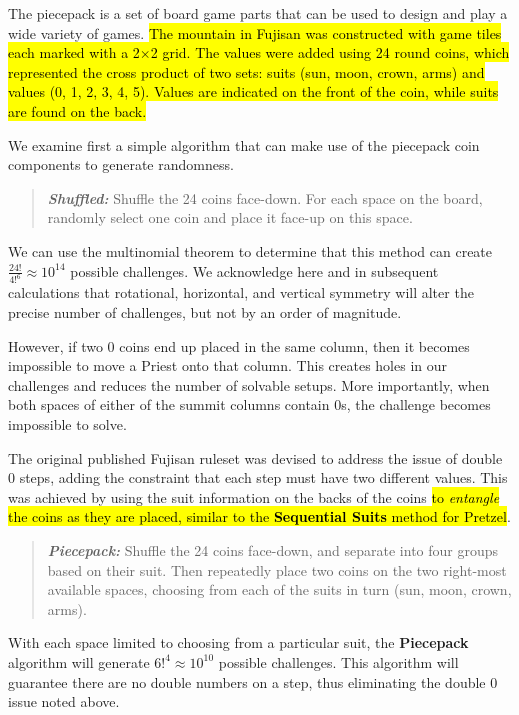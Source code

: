 \documentclass[journal]{IEEEtran}
\begin{document}
The piecepack is a set of board game parts that can be used to design and play a wide variety of games\cite{GAMESYSTEM}. \hl{The mountain in Fujisan was constructed with game tiles each marked with a 2$\times$2 grid. The values were added using 24 round coins, which represented the cross product of two sets: suits (sun, moon, crown, arms) and values (0, 1, 2, 3, 4, 5). Values are indicated on the front of the coin, while suits are found on the back.}

We examine first a simple algorithm that can make use of the piecepack coin components to generate randomness. 

\begin{quote}
    
  {\it \bf Shuffled:} Shuffle the 24 coins face-down. For each space on the board, randomly select one coin and place it face-up on this space.
  
\end{quote}

We can use the multinomial theorem to determine that this method can create
$\frac{24!}{4!^{6}} \approx 10^{14}$ possible challenges.  We acknowledge here and in subsequent calculations that rotational, horizontal, and vertical symmetry will alter the precise number of challenges, but not by an order of magnitude.

However, if two 0 coins end up placed in the same column, then it becomes impossible to move a Priest onto that column. This creates holes in our challenges and reduces the number of solvable setups. 
More importantly, when both spaces of either of the summit columns contain 0s, the challenge becomes impossible to solve.

The original published Fujisan ruleset was devised to address the issue of double 0 steps, adding the constraint that each step must have two different values. This was achieved by using the suit information on the backs of the coins \hl{to \textit{entangle} the coins as they are placed, similar to the \textbf{Sequential Suits} method for Pretzel}.

\begin{quote}
    
  {\it \bf Piecepack:} Shuffle the 24 coins face-down, and separate into four groups based on their suit. Then repeatedly place two coins on the two right-most available spaces, choosing from each of the suits in turn (sun, moon, crown, arms).
\end{quote}

With each space limited to choosing from a particular suit, the \textbf{Piecepack} algorithm will generate $6!^4 \approx 10^{10}$ possible challenges. This algorithm will guarantee there are no double numbers on a step, thus eliminating the double 0 issue noted above. 
\end{document}
